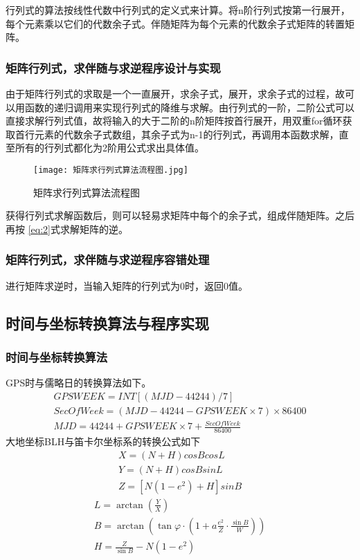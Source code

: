 \documentclass{ctexart}
\begin{document}
行列式的算法按线性代数中行列式的定义式来计算。将n阶行列式按第一行展开，每个元素乘以它们的代数余子式。伴随矩阵为每个元素的代数余子式矩阵的转置矩阵。
\subsubsection{矩阵行列式，求伴随与求逆程序设计与实现}
由于矩阵行列式的求取是一个一直展开，求余子式，展开，求余子式的过程，故可以用函数的递归调用来实现行列式的降维与求解。由行列式的一阶，二阶公式可以直接求解行列式值，故将输入的大于二阶的n阶矩阵按首行展开，用双重for循环获取首行元素的代数余子式数组，其余子式为n-1的行列式，再调用本函数求解，直至所有的行列式都化为2阶用公式求出具体值。
\begin{figure}[H]
\texttt{[image: 矩阵求行列式算法流程图.jpg]}
\caption{矩阵求行列式算法流程图}
\end{figure}

获得行列式求解函数后，则可以轻易求矩阵中每个的余子式，组成伴随矩阵。之后再按
\eqref{eq:2}式求解矩阵的逆。
\subsubsection{矩阵行列式，求伴随与求逆程序容错处理}
进行矩阵求逆时，当输入矩阵的行列式为0时，返回0值。

\subsection{时间与坐标转换算法与程序实现}
\subsubsection{时间与坐标转换算法}
GPS时与儒略日的转换算法如下。
\begin{equation}
\begin{gathered}%
GPS WEEK=INT[(MJD-44244)/7]\\
SecOfWeek=(MJD-44244-GPSWEEK\times7)\times86400\\
MJD=44244+GPSWEEK\times7+\frac{SecOfWeek}{86400}
\end{gathered}
\end{equation}
大地坐标BLH与笛卡尔坐标系的转换公式如下
\begin{equation}
\begin{gathered}
X=(N+H)cosBcosL  \\
Y=(N+H)cosBsinL \\
Z=[N(1-e^2)+H]sinB
\label{eq:4}
\end{gathered}
\end{equation}
\vspace{1cm}
\begin{equation}
\begin{gathered}
L=\arctan \left(\frac{Y}{X}\right) \\
B=\arctan \left(\tan \varphi \cdot\left(1+a \frac{e^{2}}{Z} \cdot \frac{\sin B}{W}\right)\right) \\
H=\frac{Z}{\sin B}-N(1-e^2)
\label{eq:5}
\end{gathered}
\end{equation}
\end{document}
